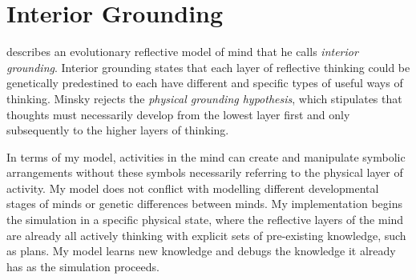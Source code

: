\section{Interior Grounding}

\cite{minsky:2005} describes an evolutionary reflective model of mind
that he calls \emph{interior grounding}.  Interior grounding states
that each layer of reflective thinking could be genetically
predestined to each have different and specific types of useful ways
of thinking.  Minsky rejects the \emph{physical grounding hypothesis},
which stipulates that thoughts must necessarily develop from the
lowest layer first and only subsequently to the higher layers of
thinking.

In terms of my model, activities in the mind can create and manipulate
symbolic arrangements without these symbols necessarily referring to
the physical layer of activity.  My model does not conflict with
modelling different developmental stages of minds or genetic
differences between minds.  My implementation begins the simulation in
a specific physical state, where the reflective layers of the mind are
already all actively thinking with explicit sets of pre-existing
knowledge, such as plans.  My model learns new knowledge and debugs
the knowledge it already has as the simulation proceeds.

